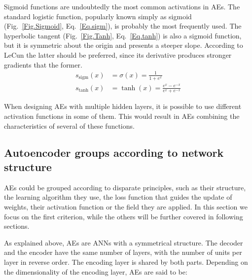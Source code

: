 Sigmoid functions are  undoubtedly the most common activations in AEs. The standard logistic function, popularly known simply as  sigmoid (Fig.~\ref{Fig.Sigmoid}, Eq.~\ref{Eq.sigm}), is probably the most frequently used. The hyperbolic tangent (Fig.~\ref{Fig.Tanh}, Eq.~\ref{Eq.tanh}) is also a sigmoid function, but it is symmetric about the origin and presents a steeper slope. According to LeCun \cite{EfficientBackprop} the latter should be preferred, since its derivative produces stronger gradients that the former.
\begin{align}
  \label{Eq.sigm} s_{\mathrm{sigm}}(x) &= \sigma(x) = \frac{1}{1+e^x} \\
  \label{Eq.tanh} s_{\mathrm{tanh}}(x) &= \tanh(x) = \frac{e^x-e^{-x}}{e^x+e^{-x}}
\end{align}


When designing AEs with multiple hidden layers, it is possible to use different activation functions in some of them. This would result in AEs combining the characteristics of several of these functions.


\subsection{Autoencoder groups according to network structure}

AEs could be grouped according to disparate principles, such as their structure, the learning algorithm they use, the loss function that guides the update of weights, their activation function or the field they are applied. In this section we focus on the first criterion, while the others will be further covered in following sections. 

As explained above, AEs are ANNs with a symmetrical structure. The decoder and the encoder have the same number of layers, with the number of units per layer in reverse order. The encoding layer is shared by both parts. Depending on the dimensionality of the encoding layer, AEs are said to be:

